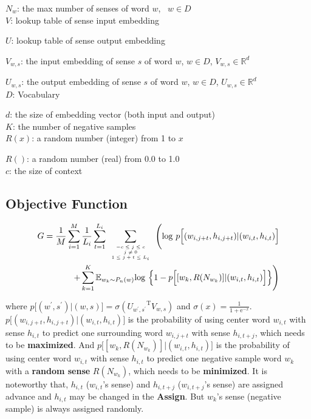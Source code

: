 \documentclass[12pt,a4paper,twoside]{book}
\begin{document}
$N_w$: the max number of senses of word $w$, \ $w\in D$\\

$V$: lookup table of sense input embedding 

$U$: lookup table of  sense output embedding 

$V_{w,s}$: the input embedding of sense $s$ of word $w$, $w\in D$, $V_{w,s} \in \mathbb{R}^d$

$U_{w,s}$: the output embedding of sense $s$ of word $w$, $w\in D$, $U_{w,s} \in \mathbb{R}^d$\\

$D$: Vocabulary 

$d$: the size of embedding vector (both input and output)\\

$K$: the number of negative samples\\

$R(x)$: a random number (integer) from 1 to $x$

$R()$: a random number (real) from 0.0 to 1.0\\

$c$: the size of context
\subsection{Objective Function}
\begin{equation}
\begin{split}
G = \frac{1}{M}\sum_{i=1}^M\frac{1}{L_i}\sum_{t=1}^{L_i}\sum\limits_{\mbox{\tiny$\begin{array}{c}-c\leq j \leq c\\ j\neq 0\\ 1\leq j+t\leq L_i\end{array}$}}\Bigg (\mathrm{log}\ p\Big [(w_{i,j+t},h_{i,j+t})|(w_{i,t},h_{i,t})\Big ] \\
+\sum\limits_{k=1}^K\mathbb{E}_{w_k\sim P_n(w)}\mathrm{log}\ \Big \{1-p\Big[[w_k,R(N_{w_k})]|(w_{i,t},h_{i,t})\Big ] \Big \} \Bigg )
\end{split}
\end{equation} 

where $p\Big[(w^\prime,s^\prime)|(w,s)\Big] = \sigma({U_{w^\prime,s^\prime}}^{\mathrm{T}}V_{w,s})$
 and $\sigma(x) = \frac{1}{1+\mathrm{e}^{-x}}$. \\
 
 $p\Big [(w_{i,j+t},h_{i,j+t})|(w_{i,t},h_{i,t})\Big ]$ is the probability of using center word $w_{i,t}$ with sense $h_{i,t}$ to predict one surrounding word $w_{i,j+t}$ with sense $h_{i,t+j}$, which needs to be \textbf{maximized}.
And $p\Big[[w_k,R(N_{w_k})]|(w_{i,t},h_{i,t})\Big ]$ is the probability of using center word $w_{i,t}$ with sense $h_{i,t}$ to predict one negative sample word $w_k$ with a \textbf{random sense} $R(N_{w_k})$, which needs to be \textbf{minimized}. 
It is noteworthy that, $h_{i,t}$  ($w_{i,t}$'s sense) and $h_{i,t+j}$ ($w_{i,t+j}$'s sense) are assigned advance and $h_{i,t}$ may be changed in the \textbf{Assign}. But $w_k$'s sense (negative sample) is always assigned randomly. \\
\end{document}
